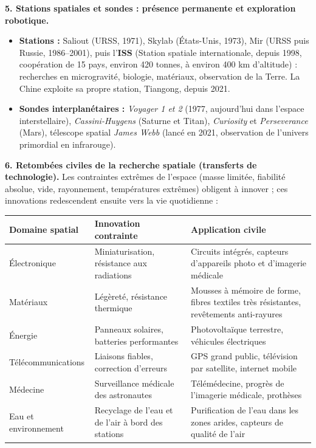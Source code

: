 \documentclass[11pt]{article}
\begin{document}
\textbf{5. Stations spatiales et sondes : présence permanente et exploration robotique.}
\begin{itemize}
    \item \textbf{Stations :} Saliout (URSS, 1971), Skylab (États-Unis, 1973), Mir (URSS puis Russie, 1986–2001), puis l'\textbf{ISS} (Station spatiale internationale, depuis 1998, coopération de 15 pays, environ 420 tonnes, à environ 400 km d'altitude) : recherches en microgravité, biologie, matériaux, observation de la Terre. La Chine exploite sa propre station, Tiangong, depuis 2021.
    \item \textbf{Sondes interplanétaires :} \textit{Voyager 1 et 2} (1977, aujourd'hui dans l'espace interstellaire), \textit{Cassini-Huygens} (Saturne et Titan), \textit{Curiosity} et \textit{Perseverance} (Mars), télescope spatial \textit{James Webb} (lancé en 2021, observation de l'univers primordial en infrarouge).
\end{itemize}

\textbf{6. Retombées civiles de la recherche spatiale (transferts de technologie).}
Les contraintes extrêmes de l'espace (masse limitée, fiabilité absolue, vide, rayonnement, températures extrêmes) obligent à innover ; ces innovations redescendent ensuite vers la vie quotidienne :
\begin{center}
\begin{tabularx}{\linewidth}{|l|X|X|}\hline
\rowcolor{popblueL}
\textbf{Domaine spatial} & \textbf{Innovation contrainte} & \textbf{Application civile} \\ \hline
Électronique & Miniaturisation, résistance aux radiations & Circuits intégrés, capteurs d'appareils photo et d'imagerie médicale \\ \hline
Matériaux & Légèreté, résistance thermique & Mousses à mémoire de forme, fibres textiles très résistantes, revêtements anti-rayures \\ \hline
Énergie & Panneaux solaires, batteries performantes & Photovoltaïque terrestre, véhicules électriques \\ \hline
Télécommunications & Liaisons fiables, correction d'erreurs & GPS grand public, télévision par satellite, internet mobile \\ \hline
Médecine & Surveillance médicale des astronautes & Télémédecine, progrès de l'imagerie médicale, prothèses \\ \hline
Eau et environnement & Recyclage de l'eau et de l'air à bord des stations & Purification de l'eau dans les zones arides, capteurs de qualité de l'air \\ \hline
\end{tabularx}
\end{center}
\end{document}

